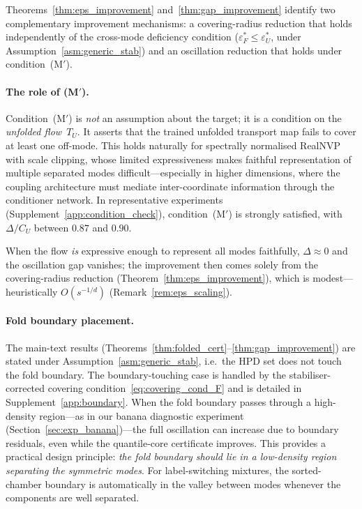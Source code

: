 Theorems~\ref{thm:eps_improvement} and~\ref{thm:gap_improvement}
identify two complementary improvement mechanisms: a covering-radius
reduction that holds independently of the cross-mode deficiency
condition ($\varepsilon_F^* \leq \varepsilon_U^*$, under
Assumption~\ref{asm:generic_stab}) and an oscillation
reduction that holds under condition~(M$'$).

\paragraph{The role of (M$'$).}
Condition~(M$'$) is \emph{not} an assumption about the target; it is
a condition on the \emph{unfolded flow}~$T_U$.  It asserts that the
trained unfolded transport map fails to cover at least one off-mode.  This holds
naturally for spectrally normalised RealNVP with scale clipping,
whose limited expressiveness makes faithful representation of
multiple separated modes difficult---especially in higher dimensions,
where the coupling architecture must mediate inter-coordinate
information through the conditioner network.  In representative
experiments (Supplement~\ref{app:condition_check}), condition~(M$'$)
is strongly satisfied, with $\Delta/C_U$ between $0.87$ and $0.90$.

When the flow \emph{is} expressive enough to represent all modes
faithfully, $\Delta \approx 0$ and the oscillation gap vanishes;
the improvement then comes solely from the covering-radius
reduction (Theorem~\ref{thm:eps_improvement}), which is
modest---heuristically $O(s^{-1/d})$
(Remark~\ref{rem:eps_scaling}).

\paragraph{Fold boundary placement.}
The main-text results
(Theorems~\ref{thm:folded_cert}--\ref{thm:gap_improvement})
are stated under Assumption~\ref{asm:generic_stab}, i.e.\ the HPD
set does not touch the fold boundary.  The boundary-touching case
is handled by the stabiliser-corrected covering
condition~\eqref{eq:covering_cond_F} and is detailed in
Supplement~\ref{app:boundary}.
When the fold boundary passes
through a high-density region---as in our banana diagnostic
experiment (Section~\ref{sec:exp_banana})---the full oscillation
can increase due to boundary residuals, even while the
quantile-core certificate improves.  This provides a practical
design principle: \emph{the fold boundary should lie in a
low-density region separating the symmetric modes}.
For label-switching mixtures, the sorted-chamber boundary
is automatically in the valley between modes whenever the
components are well separated.

